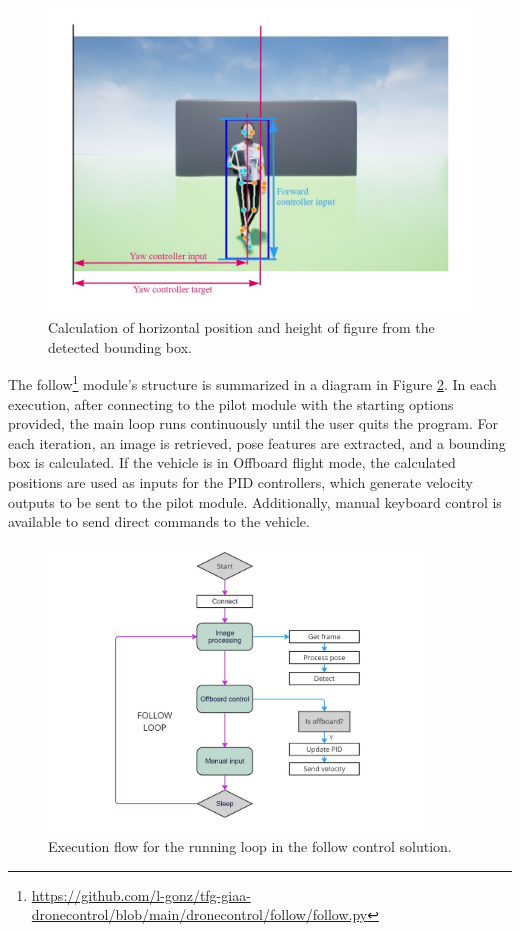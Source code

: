 \begin{figure}
  \centering
  \includegraphics[width=\textwidth, keepaspectratio]{img/pose-calculations.jpg}
  \caption{Calculation of horizontal position and height of figure from the detected bounding box.}
  \label{fig:follow-input-calcs}
\end{figure}

The follow\footnote{\url{https://github.com/l-gonz/tfg-giaa-dronecontrol/blob/main/dronecontrol/follow/follow.py}} module's structure is summarized in a diagram in Figure \ref{fig:follow-loop}.
In each execution, after connecting to the pilot module with the starting options provided, the main loop runs continuously until the user quits the program.
For each iteration, an image is retrieved, pose features are extracted, and a bounding box is calculated. If the vehicle is in Offboard flight mode, the calculated positions are used as inputs for the PID controllers, which generate velocity outputs to be sent to the pilot module. Additionally, manual keyboard control is available to send direct commands to the vehicle.

\begin{figure}
  \centering
  \includegraphics[width=0.9\textwidth, keepaspectratio]{img/follow-loop.jpg}
  \caption{Execution flow for the running loop in the follow control solution.}
  \label{fig:follow-loop}
\end{figure}

